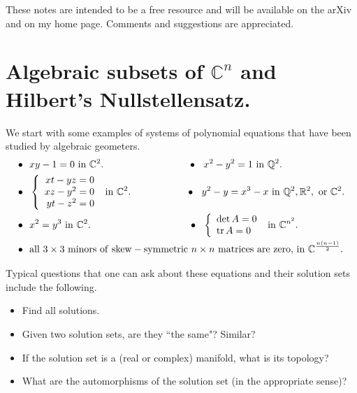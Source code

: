 \documentclass[11pt]{article}
\numberwithin{equation}{section}
\numberwithin{footnote}{section}
\newcommand{\R}{{\mathbb R}}
\newcommand{\Q}{{\mathbb Q}}
\newcommand{\C}{{\mathbb C}}
\begin{document}
\smallskip
These notes are intended to be a free resource and will be available on the arXiv  and on my home page. Comments and suggestions are appreciated. 





\tableofcontents
 
 \newpage

\section{Algebraic subsets of $\mathbb C^n$ and Hilbert's Nullstellensatz.}
We start with some examples of systems of polynomial equations that have been studied by algebraic geometers.
\begin{align*}
\bullet~~&xy-1=0 \mathrm{~in~} \C^2.
\hskip 80pt~~\bullet~~x^2-y^2=1 \mathrm{~in~} \Q^2.
 \\
\bullet~~&\left\{
\begin{array}{r}
xt-yz=0\\
xz-y^2=0\\
yt-z^2=0
\end{array}\right.  \mathrm{~in~} \C^2.
\hskip 50pt~~\bullet~~y^2-y=x^3-x \mathrm{~in~} \Q^2,\R^2, \mathrm{~or~} \C^2.
 \\
\bullet~~&x^2=y^3 \mathrm{~in~} \C^2. 
\hskip 94pt~~\bullet~~\left\{
\begin{array}{l}
\det A =0\\
\mathrm{tr} \,A =0
\end{array}\right.  \mathrm{~in~} \C^{n^2}. 
\\
\bullet~~&\mathrm{all~}3\times 3 \mathrm{~minors~of~skew-symmetric~}
n\times n\mathrm{~matrices~are~zero,} \mathrm{~in~}\C^{\frac {n(n-1)}2}. 
\end{align*}

\noindent
Typical questions that one can ask about these equations and their solution sets include the following.

\begin{itemize}
\item Find all solutions. 

\item Given two solution sets, are they ``the same"? Similar?

\item If the solution set is a (real or complex) manifold, what is its topology?

\item What are the automorphisms of the solution set (in the  appropriate sense)?

\end{itemize}
\end{document}
